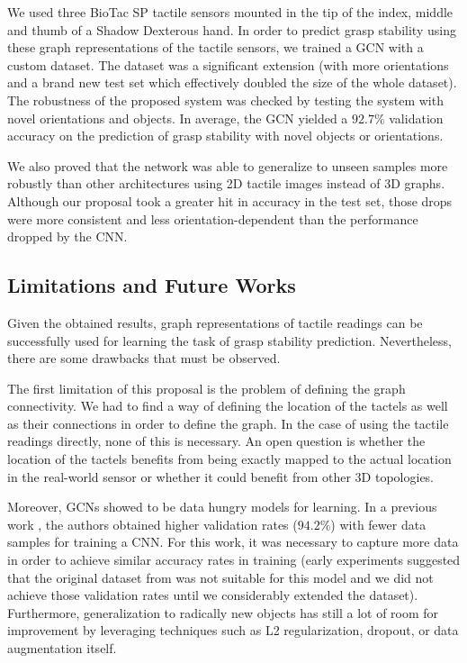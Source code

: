 We used three BioTac SP tactile sensors mounted in the tip of the index, middle and thumb of a Shadow Dexterous hand. In order to predict grasp stability using these graph representations of the tactile sensors, we trained a \ac{GCN} with a custom dataset. The dataset was a significant extension (with more orientations and a brand new test set which effectively doubled the size of the whole dataset). The robustness of the proposed system was checked by testing the system with novel orientations and objects. In average, the \ac{GCN} yielded a $92.7\%$ validation accuracy on the prediction of grasp stability with novel objects or orientations.

\clearpage

We also proved that the network was able to generalize to unseen samples more robustly than other architectures using \acs{2D} tactile images instead of \acs{3D} graphs. Although our proposal took a greater hit in accuracy in the test set, those drops were more consistent and less orientation-dependent than the performance dropped by the \ac{CNN}.

\subsection{Limitations and Future Works}
\label{cha:tactile:sec:conclusion:subsec:limitations}

Given the obtained results, graph representations of tactile readings can be successfully used for learning the task of grasp stability prediction. Nevertheless, there are some drawbacks that must be observed.

The first limitation of this proposal is the problem of defining the graph connectivity. We had to find a way of defining the location of the tactels as well as their connections in order to define the graph. In the case of using the tactile readings directly, none of this is necessary. An open question is whether the location of the tactels benefits from being exactly mapped to the actual location in the real-world sensor or whether it could benefit from other  \acs{3D} topologies.

Moreover, \acp{GCN} showed to be data hungry models for learning. In a previous work \cite{Zapata2018}, the authors obtained higher validation rates ($94.2\%$) with fewer data samples for training a \ac{CNN}. For this work, it was necessary to capture more data in order to achieve similar accuracy rates in training (early experiments suggested that the original dataset from \cite{Zapata2018} was not suitable for this model and we did not achieve those validation rates until we considerably extended the dataset). Furthermore, generalization to radically new objects has still a lot of room for improvement by leveraging techniques such as L2 regularization, dropout, or data augmentation itself.

